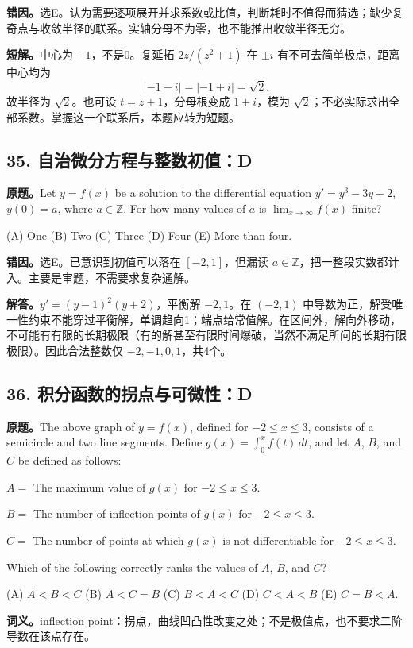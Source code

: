 \documentclass[11pt,a4paper,fontset=fandol]{ctexart}
\begin{document}
\textbf{错因。}选E。认为需要逐项展开并求系数或比值，判断耗时不值得而猜选；缺少复奇点与收敛半径的联系。实轴分母不为零，也不能推出收敛半径无穷。

\textbf{短解。}中心为 $-1$，不是0。复延拓 $2z/(z^2+1)$ 在 $\pm i$ 有不可去简单极点，距离中心均为
\[
|-1-i|=|-1+i|=\sqrt2.
\]
故半径为 $\sqrt2$。也可设 $t=z+1$，分母根变成 $1\pm i$，模为 $\sqrt2$；不必实际求出全部系数。掌握这一个联系后，本题应转为短题。

\subsection{35. 自治微分方程与整数初值：D}
\label{ms:q35}
\textbf{原题。}Let $y=f(x)$ be a solution to the differential equation $y'=y^3-3y+2$, $y(0)=a$, where $a\in\mathbb Z$. For how many values of $a$ is $\displaystyle\lim_{x\to\infty}f(x)$ finite?

(A) One \quad (B) Two \quad (C) Three \quad (D) Four \quad (E) More than four.

\textbf{错因。}选E。已意识到初值可以落在 $[-2,1]$，但漏读 $a\in\mathbb Z$，把一整段实数都计入。主要是审题，不需要求复杂通解。

\textbf{解答。}$y'=(y-1)^2(y+2)$，平衡解 $-2,1$。在 $(-2,1)$ 中导数为正，解受唯一性约束不能穿过平衡解，单调趋向1；端点给常值解。在区间外，解向外移动，不可能有有限的长期极限（有的解甚至有限时间爆破，当然不满足所问的长期有限极限）。因此合法整数仅 $-2,-1,0,1$，共4个。

\subsection{36. 积分函数的拐点与可微性：D}
\label{ms:q36}
\textbf{原题。}The above graph of $y=f(x)$, defined for $-2\le x\le3$, consists of a semicircle and two line segments. Define $g(x)=\int_0^x f(t)\,dt$, and let $A$, $B$, and $C$ be defined as follows:

$A=$ The maximum value of $g(x)$ for $-2\le x\le3$.

$B=$ The number of inflection points of $g(x)$ for $-2\le x\le3$.

$C=$ The number of points at which $g(x)$ is not differentiable for $-2\le x\le3$.

Which of the following correctly ranks the values of $A$, $B$, and $C$?

(A) $A<B<C$ \quad (B) $A<C=B$ \quad (C) $B<A<C$ \quad (D) $C<A<B$ \quad (E) $C=B<A$.

\begin{center}
\end{center}
\textbf{词义。}inflection point：拐点，曲线凹凸性改变之处；不是极值点，也不要求二阶导数在该点存在。
\end{document}
